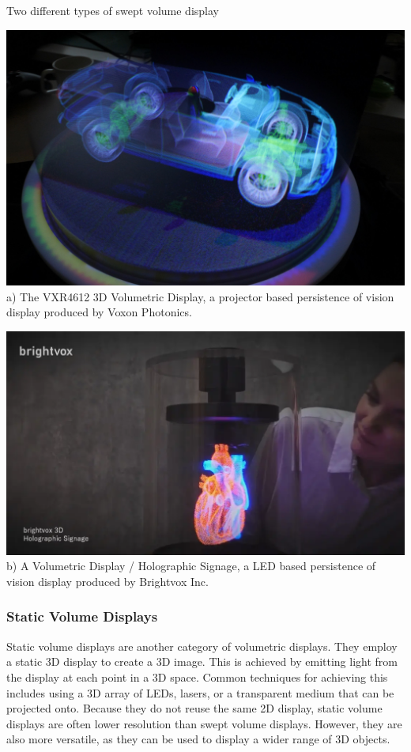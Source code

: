 \begin{figureBox}[label={fig:swept-volume-displays}]{Two different types of swept volume display}
    \begin{minipage}[t]{0.48\textwidth}
      \includegraphics[width=\textwidth]{./figures/background/3d/voxon.jpg}
      \small {a) The VXR4612 3D Volumetric Display, a projector based persistence of vision display produced by Voxon Photonics.} 
    \end{minipage}\hfill
    \begin{minipage}[t]{0.48\textwidth}
      \includegraphics[width=\textwidth]{./figures/background/3d/brightvox.png}
      \small {b) A Volumetric Display / Holographic Signage, a LED based persistence of vision display produced by Brightvox Inc.}
    \end{minipage}
  \end{figureBox}
  

\subsubsection{Static Volume Displays}
Static volume displays are another category of volumetric displays. They employ a static 3D display to create a 3D image. This is achieved by emitting light from the display at each point in a 3D space. Common techniques for achieving this includes using a 3D array of LEDs, lasers, or a transparent medium that can be projected onto. Because they do not reuse the same 2D display, static volume displays are often lower resolution than swept volume displays. However, they are also more versatile, as they can be used to display a wider range of 3D objects.